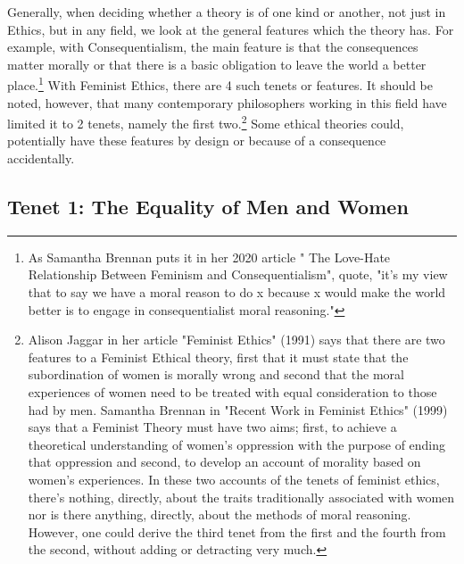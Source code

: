 Generally, when deciding whether a theory is of one kind or another, not just in Ethics, but in any field, we look at the general features which the theory has. For example, with Consequentialism, the main feature is that the consequences matter morally or that there is a basic obligation to leave the world a better place.\footnote{As Samantha Brennan puts it in her 2020 article " The Love-Hate Relationship Between Feminism and Consequentialism", quote, "it's my view that to say we have a moral reason to do x because x would make the world better is to engage in consequentialist moral reasoning."\autocite{Brennan1}} With Feminist Ethics, there are 4 such tenets or features. It should be noted, however, that many contemporary philosophers working in this field have limited it to 2 tenets, namely the first two.\footnote{Alison Jaggar in her article "Feminist Ethics" (1991) says that there are two features to a Feminist Ethical theory, first that it must state that the subordination of women is morally wrong and second that the moral experiences of women need to be treated with equal consideration to those had by men.\autocite{Jaggar1} Samantha Brennan in "Recent Work in Feminist Ethics" (1999) says that a Feminist Theory must have two aims; first, to achieve a theoretical understanding of women's oppression with the purpose of ending that oppression and second, to develop an account of morality based on women's experiences.\autocite{Brennan2} In these two accounts of the tenets of feminist ethics, there's nothing, directly, about the traits traditionally associated with women nor is there anything, directly, about the methods of moral reasoning. However, one could derive the third tenet from the first and the fourth from the second, without adding or detracting very much. } Some ethical theories could, potentially have these features by design or because of a consequence accidentally.

\subsection{Tenet 1: The Equality of Men and Women}

